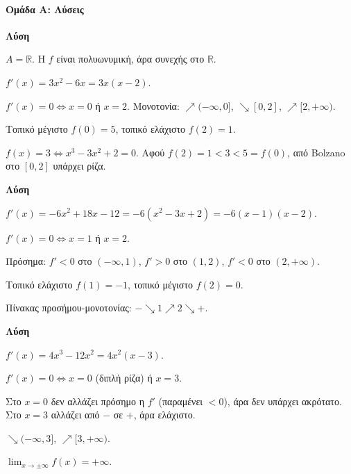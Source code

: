 \documentclass[11pt,a4paper,modern]{FFExercises}
\begin{document}

\paragraph{Ομάδα Α: Λύσεις}

\askhsh %
\textbf{Λύση}
\begin{alist}
    \item $A = \mathbb{R}$. Η $f$ είναι πολυωνυμική, άρα συνεχής στο $\mathbb{R}$.
    \item $f'(x) = 3x^2 - 6x = 3x(x-2)$.
    \item $f'(x) = 0 \Leftrightarrow x = 0$ ή $x = 2$. Μονοτονία: $\nearrow (-\infty, 0]$, $\searrow [0, 2]$, $\nearrow [2, +\infty)$.
    \item Τοπικό μέγιστο $f(0) = 5$, τοπικό ελάχιστο $f(2) = 1$.
    \item $f(x) = 3 \Leftrightarrow x^3 - 3x^2 + 2 = 0$. Αφού $f(2) = 1 < 3 < 5 = f(0)$, από Bolzano στο $[0, 2]$ υπάρχει ρίζα.
\end{alist}

\askhsh %
\textbf{Λύση}
\begin{alist}
    \item $f'(x) = -6x^2 + 18x - 12 = -6(x^2 - 3x + 2) = -6(x-1)(x-2)$.
    \item $f'(x) = 0 \Leftrightarrow x = 1$ ή $x = 2$.
    \item Πρόσημα: $f' < 0$ στο $(-\infty, 1)$, $f' > 0$ στο $(1, 2)$, $f' < 0$ στο $(2, +\infty)$.
    \item Τοπικό ελάχιστο $f(1) = -1$, τοπικό μέγιστο $f(2) = 0$.
    \item Πίνακας προσήμου-μονοτονίας: $- \searrow 1 \nearrow 2 \searrow +$.
\end{alist}

\askhsh %
\textbf{Λύση}
\begin{alist}
    \item $f'(x) = 4x^3 - 12x^2 = 4x^2(x - 3)$.
    \item $f'(x) = 0 \Leftrightarrow x = 0$ (διπλή ρίζα) ή $x = 3$.
    \item Στο $x = 0$ δεν αλλάζει πρόσημο η $f'$ (παραμένει $< 0$), άρα δεν υπάρχει ακρότατο. Στο $x = 3$ αλλάζει από $-$ σε $+$, άρα ελάχιστο.
    \item $\searrow (-\infty, 3]$, $\nearrow [3, +\infty)$.
    \item $\lim_{x \to \pm\infty} f(x) = +\infty$.
\end{alist}
\end{document}
